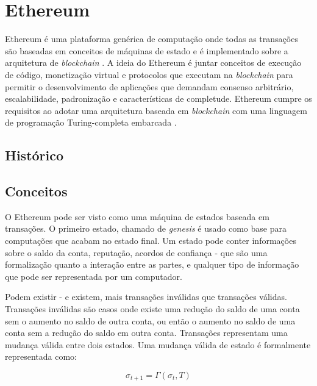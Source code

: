 \documentclass[tcc,capa]{texufpel}
\begin{document}
        

\newpage
\section{Ethereum}

    Ethereum é uma plataforma genérica de computação onde todas as transações são baseadas em conceitos de máquinas de estado e é implementado sobre a arquitetura de \textit{blockchain} \cite{wood2014ethereum}. A ideia do Ethereum é juntar conceitos de execução de código, monetização virtual e protocolos que executam na \textit{blockchain} para permitir o desenvolvimento de aplicações que demandam consenso arbitrário, escalabilidade, padronização e características de completude. Ethereum cumpre os requisitos ao adotar uma arquitetura baseada em \textit{blockchain} com uma linguagem de programação Turing-completa embarcada \cite{buterin2014next}.

	\subsection{Histórico}
	
	

	\subsection{Conceitos}
	
	    O Ethereum pode ser visto como uma máquina de estados baseada em transações. O primeiro estado, chamado de \textit{genesis} é usado como base para computações que acabam no estado final. Um estado pode conter informações sobre o saldo da conta, reputação, acordos de confiança - que são uma formalização quanto a interação entre as partes, e qualquer tipo de informação que pode ser representada por um computador.
	    
	    Podem existir - e existem, mais transações inválidas que transações válidas. Transações inválidas são casos onde existe uma redução do saldo de uma conta sem o aumento no saldo de outra conta, ou então o aumento no saldo de uma conta sem a redução do saldo em outra conta. Transações representam uma mudança válida entre dois estados. Uma mudança válida de estado é formalmente representada como:
	    
	    \begin{equation}
	        \sigma_{t+1} = \Gamma(\sigma_t, T)
	    \end{equation}
	    
\end{document}
